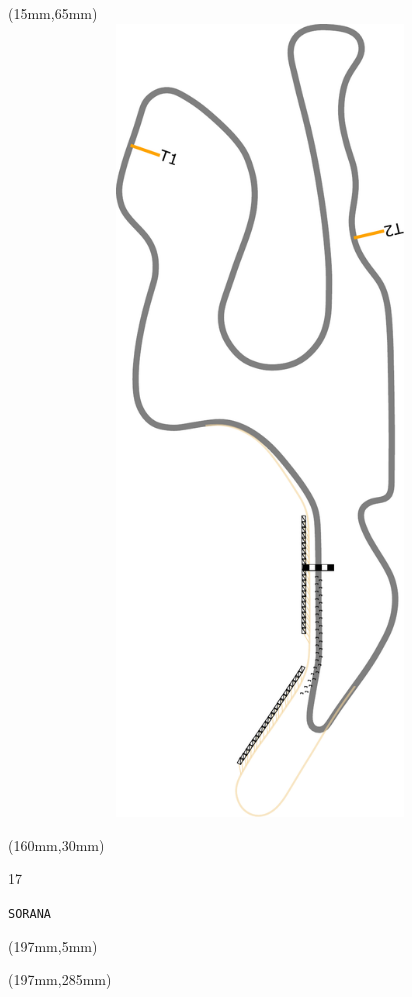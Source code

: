 \begin{textblock*}{185mm}(15mm,65mm)%
\centering
\mbox{\includegraphics[width=185mm,height=210mm,keepaspectratio]{PT/SORANA.pdf}}
\end{textblock*}
\begin{textblock*}{40mm}(160mm,30mm)%
\Large
\par{} 
\par17 
\par\hfill\tiny\tt SORANA\\
\end{textblock*}
\begin{textblock*}{20mm}(197mm,5mm)%
\fbox{\thepage}
\label{SORANA}
\end{textblock*}
\begin{textblock*}{20mm}(197mm,285mm)%
\fbox{\thepage}
\end{textblock*}

